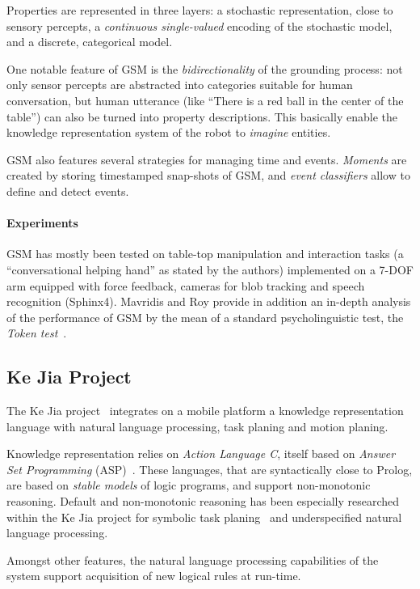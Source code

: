 Properties are represented in three layers: a stochastic representation, close
to sensory percepts, a \emph{continuous single-valued} encoding of the
stochastic model, and a discrete, categorical model.

One notable feature of GSM is the \emph{bidirectionality} of the grounding
process: not only sensor percepts are abstracted into categories suitable for
human conversation, but human utterance (like ``There is a red ball in the
center of the table'') can also be turned into property descriptions. This
basically enable the knowledge representation system of the robot to
\emph{imagine} entities.

GSM also features several strategies for managing time and events.
\emph{Moments} are created by storing timestamped snap-shots of GSM, and
\emph{event classifiers} allow to define and detect events.

\paragraph{Experiments} GSM has mostly been tested on table-top manipulation
and interaction tasks (a ``conversational helping hand'' as stated by the
authors) implemented on a 7-DOF arm equipped with force feedback, cameras for blob
tracking and speech recognition (Sphinx4). Mavridis and Roy provide in addition
an in-depth analysis of the performance of GSM by the mean of a standard
psycholinguistic test, the \emph{Token test}~\cite{DiSimoni1978}.

\subsection{Ke Jia Project}
\label{sect|kejia}

The Ke Jia project~\cite{Chen2010} integrates on a mobile platform a knowledge
representation language with natural language processing, task planing and
motion planing.

Knowledge representation relies on \emph{Action Language C}, itself based on
\emph{Answer Set Programming} (ASP)~\cite{Gelfond2008}. These languages, that
are syntactically close to Prolog, are based on \emph{stable models} of logic
programs, and support non-monotonic reasoning. Default and non-monotonic
reasoning has been especially researched within the Ke Jia project for symbolic
task planing~\cite{Ji2011} and underspecified natural language processing.

Amongst other features, the natural language processing capabilities of the
system support acquisition of new logical rules at run-time.


